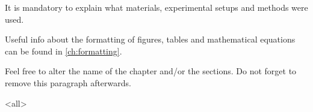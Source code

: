 \label{ch:materialsmethods}

\begin{mycomments}
    It is mandatory to explain what materials, experimental setups and methods were used.
    
    Useful info about the formatting of figures, tables and mathematical equations can be found in \cref{ch:formatting}.
    
    Feel free to alter the name of the chapter and/or the sections. Do not forget to remove this paragraph afterwards.
\end{mycomments}




\mode<all> %